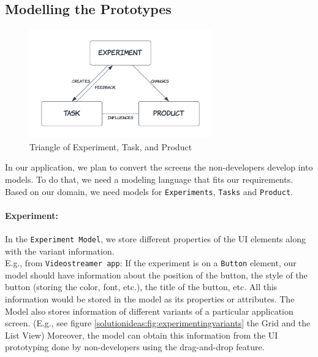 \subsection{Modelling the Prototypes}

\begin{figure}[h]
	\centering
  \includegraphics[width=0.7\textwidth]{images/solution-ideas/Triangle.png}
	\caption{Triangle of Experiment, Task, and Product}
	\label{solutionideas:fig:triangle}
\end{figure}

In our application, we plan to convert the screens the non-developers develop into models. 
To do that, we need a modeling language that fits our requirements. 
Based on our domain, we need models for \texttt{Experiments}, \texttt{Tasks} and \texttt{Product}.

\paragraph{Experiment:} In the \texttt{Experiment Model}, we store different properties of the UI elements along with the variant information.\\
E.g., from \texttt{Videostreamer app}: If the experiment is on a \texttt{Button} element, our model should have information about the position of the button, the style of the button (storing the color, font, etc.), the title of the button, etc. All this information would be stored in the model as its properties or attributes.
The Model also stores information of different variants of a particular application screen. (E.g., see figure \ref{solutionideas:fig:experimentingvariants} the Grid and the List View)
Moreover, the model can obtain this information from the UI prototyping done by non-developers using the drag-and-drop feature.

